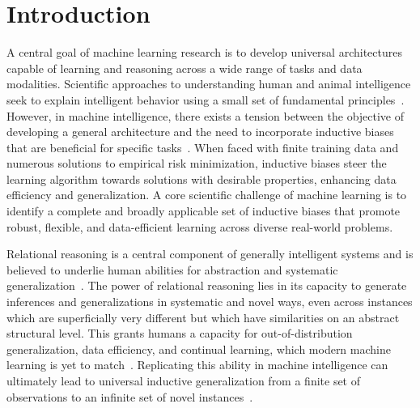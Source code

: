 \section{Introduction}\label{sec:intro}

A central goal of machine learning research is to develop universal architectures capable of learning and reasoning across a wide range of tasks and data modalities. Scientific approaches to understanding human and animal intelligence seek to explain intelligent behavior using a small set of fundamental principles~\citep{marcus2003algebraic}. However, in machine intelligence, there exists a tension between the objective of developing a general architecture and the need to incorporate inductive biases that are beneficial for specific tasks~\citep{wolpert1995no,baxter2000model}. When faced with finite training data and numerous solutions to empirical risk minimization, inductive biases steer the learning algorithm towards solutions with desirable properties, enhancing data efficiency and generalization.
A core scientific challenge of machine learning is to identify a complete and broadly applicable set of inductive biases that promote robust, flexible, and data-efficient learning across diverse real-world problems.


Relational reasoning is a central component of generally intelligent systems and is believed to underlie human abilities for abstraction and systematic generalization~\citep{gentner1983structure,snow1984topography,kemp2008discovery,holyoak2012analogy}. The power of relational reasoning lies in its capacity to generate inferences and generalizations in systematic and novel ways, even across instances which are superficially very different but which have similarities on an abstract structural level. This grants humans a capacity for out-of-distribution generalization, data efficiency, and continual learning, which modern machine learning is yet to match~\citep{lake2017building,smith2019promise,nogueira2021investigatinglimitationstransformerssimple}. Replicating this ability in machine intelligence can ultimately lead to universal inductive generalization from a finite set of observations to an infinite set of novel instances~\citep{goyal2022inductive}.

